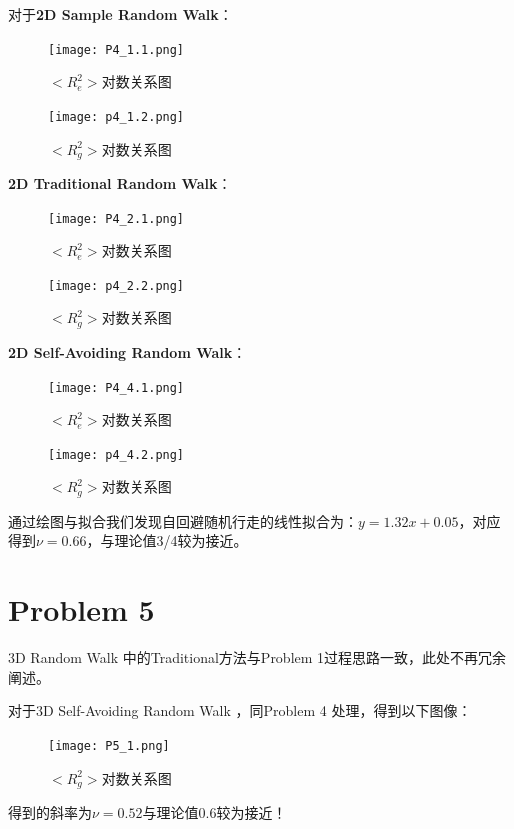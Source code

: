 \documentclass[12pt,a4paper]{article}%
\begin{document}
对于\textbf{2D Sample Random Walk}：

\begin{figure}[htbp]
    \centering
    \texttt{[image: P4\_1.1.png]}\label{fig:figure4}
    \caption{$<R_e^2>$对数关系图}
\end{figure}

\begin{figure}[htbp]
    \centering
    \texttt{[image: p4\_1.2.png]}\label{fig:figure4}
    \caption{$<R_g^2>$对数关系图}
\end{figure}

\newpage

\textbf{2D Traditional Random Walk}：

\begin{figure}[htbp]
    \centering
    \texttt{[image: P4\_2.1.png]}\label{fig:figure4}
    \caption{$<R_e^2>$对数关系图}
\end{figure}

\begin{figure}[htbp]
    \centering
    \texttt{[image: p4\_2.2.png]}\label{fig:figure4}
    \caption{$<R_g^2>$对数关系图}
\end{figure}

\newpage

\textbf{2D Self-Avoiding Random Walk}：

\begin{figure}[htbp]
    \centering
    \texttt{[image: P4\_4.1.png]}\label{fig:figure4}
    \caption{$<R_e^2>$对数关系图}
\end{figure}

\begin{figure}[htbp]
    \centering
    \texttt{[image: p4\_4.2.png]}\label{fig:figure4}
    \caption{$<R_g^2>$对数关系图}
\end{figure}

通过绘图与拟合我们发现自回避随机行走的线性拟合为：$y=1.32x+0.05$，对应得到$\nu=0.66$，与理论值3/4较为接近。
\newpage

\section{Problem 5}
3D Random Walk 中的Traditional方法与Problem 1过程思路一致，此处不再冗余阐述。

对于3D Self-Avoiding Random Walk ，同Problem 4 处理，得到以下图像：

\begin{figure}[htbp]
    \centering
    \texttt{[image: P5\_1.png]}\label{fig:figure4}
    \caption{$<R_g^2>$对数关系图}
\end{figure}

得到的斜率为$\nu=0.52$与理论值0.6较为接近！
\end{document}
